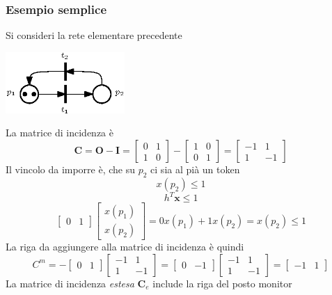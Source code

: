 \documentclass[10pt, letterpaper]{report}
\begin{document}
\subsubsection{Esempio semplice}
Si consideri la rete elementare precedente
\begin{center}
    \includegraphics[width=0.34\textwidth]{images/PetriControlloPosti1.eps}
\end{center}
La matrice di incidenza è $$ 
    \mathbf C = \mathbf O - \mathbf I =\begin{bmatrix}
        0 & 1 \\ 
        1 & 0
    \end{bmatrix}-
     \begin{bmatrix}
    1 & 0 \\ 
    0 & 1
    \end{bmatrix} = 
\begin{bmatrix}
    -1 & 1 \\ 
    1 & -1
    \end{bmatrix}
$$
Il vincolo da imporre è, che su $p_2$ ci sia al pià un token 
$$ x(p_2)\le 1$$
$$ h^T \mathbf x \le 1 $$
$$ \begin{bmatrix}
    0&
    1
\end{bmatrix}\begin{bmatrix}
    x(p_1)\\ 
    x(p_2)
\end{bmatrix}= 0x(p_1)+1x(p_2)=x(p_2)\le 1$$
La riga da aggiungere alla matrice di incidenza è quindi 
$$  C^m=-\begin{bmatrix}
    0&
    1
\end{bmatrix}\begin{bmatrix}
    -1 & 1 \\ 
    1 & -1
    \end{bmatrix}=\begin{bmatrix}
        0&
        -1
    \end{bmatrix}\begin{bmatrix}
        -1 & 1 \\ 
        1 & -1
        \end{bmatrix}=\begin{bmatrix}
            -1 & 1
        \end{bmatrix}$$
La matrice di incidenza \textit{estesa} $\mathbf C_e$ include la riga del posto monitor 
\end{document}
